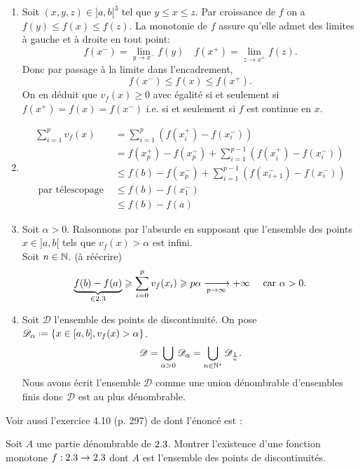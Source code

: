\begin{solution}
    \begin{enumerate}
        \item Soit $(x, y, z) \in ]a,b[^3$ tel que $y \leqslant x \leqslant z$. Par croissance de $f$ on a $f(y) \leqslant f(x) \leqslant f(z)$. La monotonie de $f$ assure qu'elle admet des limites à gauche et à droite en tout point:
        $$f(x^-) = \lim_{y \to x^-} f(y) \quad f(x^+) = \lim_{z \to x^+} f(z).$$
        Donc par passage à la limite dans l'encadrement, 
        $$f(x^-) \leqslant f(x) \leqslant f(x^+).$$
        On en déduit que $v_f(x) \geqslant 0$ avec égalité si et seulement si $f(x^+)=f(x)=f(x^-)$ i.e. si et seulement si $f$ est continue en $x$. 
        \item \begin{align*}
            \sum_{i=1}^p v_f(x) &= \sum_{i=1}^p \left( f(x_i^+) - f(x_i^-)\right) \\
            &= f(x_p^+)-f(x_p^-) + \sum_{i=1}^{p-1} \left( f(x_i^+) - f(x_i^-)\right) \\
            &\leqslant f(b) - f(x_p^-) + \sum_{i=1}^{p-1} \left( f(x_{i+1}^-) - f(x_i^-)\right) \\
            \text{ par télescopage } &\leqslant f(b) - f(x_1^-) \\
            &\leqslant f(b) - f(a)
        \end{align*}
        \item Soit $\alpha > 0$. Raisonnons par l'absurde en supposant que l'ensemble des points $x \in ]a, b[$ tels que $v_f(x) > \alpha$ est infini. \\
        Soit $n \in \mathbb{N}$. (à réécrire)
        $$\underbrace{f(b)-f(a)}_{\in 2.3} \geqslant \sum_{i=0}^p v_f(x_i) \geqslant p \alpha \xrightarrow[p \to \infty]{} + \infty \quad \text{ car } \alpha > 0.$$
        \item Soit $\mathscr{D}$ l'ensemble des points de discontinuité. On pose $\mathscr{D}_{\alpha} \defeq \left\{ x \in [a,b], v_f(x) > \alpha \right\}$.
        $$\mathscr{D} = \bigcup_{\alpha > 0} \mathscr{D}_\alpha = \bigcup_{n \in \mathbb{N}^\star} \mathscr{D}_\frac{1}{n}.$$
        Nous avons écrit l'ensemble $\mathscr{D}$ comme une union dénombrable d'ensembles finis donc $\mathscr{D}$ est au plus dénombrable.
    \end{enumerate}
\end{solution}

Voir aussi l'exercice 4.10 (p. 297) de \cite{oraux_x_ens_3} dont l'énoncé est :
\begin{exercice}
    Soit $A$ une partie dénombrable de $2.3$. Montrer l'existence d'une fonction monotone $f: 2.3 \to 2.3$ dont $A$ est l'ensemble des points de discontinuités.
\end{exercice}   